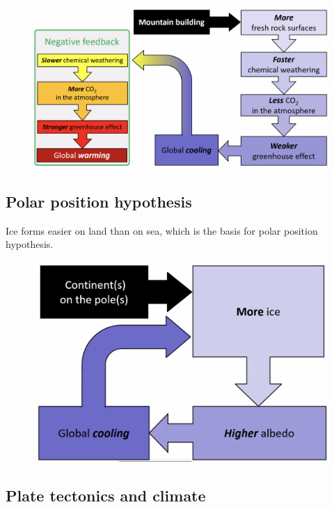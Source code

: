 \begin{figure}[H]
    \centering
    \includegraphics[width=1\linewidth]{content//img/uplift_weathering.png}
\end{figure}

\subsection{Polar position hypothesis}

Ice forms easier on land than on sea, which is the basis for polar position
hypothesis.

\begin{figure}[H]
    \centering
    \includegraphics[width=1\linewidth]{
    content/img/polar_position_hypothesis.png}
\end{figure}

\subsection{Plate tectonics and climate}

